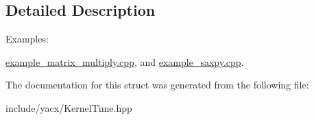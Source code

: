 \subsection{Detailed Description}
\begin{Desc}
\item[Examples\+: ]\par
\hyperlink{example_matrix_multiply_8cpp-example}{example\+\_\+matrix\+\_\+multiply.\+cpp}, and \hyperlink{example_saxpy_8cpp-example}{example\+\_\+saxpy.\+cpp}.\end{Desc}


The documentation for this struct was generated from the following file\+:\begin{DoxyCompactItemize}
\item 
include/yacx/Kernel\+Time.\+hpp\end{DoxyCompactItemize}
